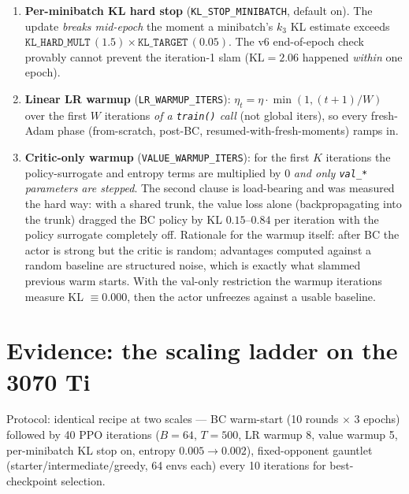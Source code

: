 \documentclass[11pt]{article}
\newcommand{\cd}[1]{\texttt{#1}}
\begin{document}
\begin{enumerate}[leftmargin=2em]
\item \textbf{Per-minibatch KL hard stop} (\cd{KL\_STOP\_MINIBATCH}, default on). The update
\emph{breaks mid-epoch} the moment a minibatch's $k_3$ KL estimate exceeds
$\cd{KL\_HARD\_MULT}\,(1.5)\times \cd{KL\_TARGET}\,(0.05)$. The v6 end-of-epoch check provably
cannot prevent the iteration-1 slam ($\text{KL}=2.06$ happened \emph{within} one epoch).
\item \textbf{Linear LR warmup} (\cd{LR\_WARMUP\_ITERS}): $\eta_t = \eta \cdot
\min(1, (t{+}1)/W)$ over the first $W$ iterations \emph{of a \cd{train()} call} (not global iters),
so every fresh-Adam phase (from-scratch, post-BC, resumed-with-fresh-moments) ramps in.
\item \textbf{Critic-only warmup} (\cd{VALUE\_WARMUP\_ITERS}): for the first $K$ iterations the
policy-surrogate and entropy terms are multiplied by 0 \emph{and only \cd{val\_*} parameters are
stepped}. The second clause is load-bearing and was measured the hard way: with a shared trunk, the
value loss alone (backpropagating into the trunk) dragged the BC policy by KL $0.15$--$0.84$ per
iteration with the policy surrogate completely off. Rationale for the warmup itself: after BC the
actor is strong but the critic is random; advantages computed against a random baseline are
structured noise, which is exactly what slammed previous warm starts. With the val-only restriction
the warmup iterations measure KL $\equiv 0.000$, then the actor unfreezes against a usable
baseline.
\end{enumerate}

\section{Evidence: the scaling ladder on the 3070 Ti}\label{v7:ladder}

Protocol: identical recipe at two scales --- BC warm-start (10 rounds $\times$ 3 epochs) followed by
40 PPO iterations ($B{=}64$, $T{=}500$, LR warmup 8, value warmup 5, per-minibatch KL stop on,
entropy $0.005\!\to\!0.002$), fixed-opponent gauntlet (starter/intermediate/greedy, 64 envs each)
every 10 iterations for best-checkpoint selection.
\end{document}
